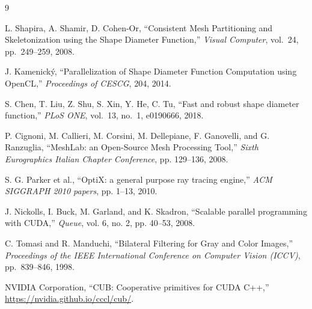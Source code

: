 \documentclass[12pt,a4paper]{report}
\begin{document}










\newpage
{}
\begin{thebibliography}{9}

L. Shapira, A. Shamir, D. Cohen-Or,
\newblock ``Consistent Mesh Partitioning and Skeletonization using the Shape Diameter Function,''
\newblock \emph{Visual Computer}, vol.~24, pp.~249--259, 2008.

J. Kamenick\'{y},
\newblock ``Parallelization of Shape Diameter Function Computation using OpenCL,''
\newblock \emph{Proceedings of CESCG}, 204, 2014.

S. Chen, T. Liu, Z. Shu, S. Xin, Y. He, C. Tu,
\newblock ``Fast and robust shape diameter function,''
\newblock \emph{PLoS ONE}, vol.~13, no.~1, e0190666, 2018.

P. Cignoni, M. Callieri, M. Corsini, M. Dellepiane, F. Ganovelli, and G. Ranzuglia,
\newblock ``MeshLab: an Open-Source Mesh Processing Tool,''
\newblock \emph{Sixth Eurographics Italian Chapter Conference}, pp. 129--136, 2008.

S. G. Parker et al.,
\newblock ``OptiX: a general purpose ray tracing engine,''
\newblock \emph{ACM SIGGRAPH 2010 papers}, pp. 1--13, 2010.

J. Nickolls, I. Buck, M. Garland, and K. Skadron,
\newblock ``Scalable parallel programming with CUDA,''
\newblock \emph{Queue}, vol. 6, no. 2, pp. 40--53, 2008.

C. Tomasi and R. Manduchi,
\newblock ``Bilateral Filtering for Gray and Color Images,''
\newblock \emph{Proceedings of the IEEE International Conference on Computer Vision (ICCV)}, pp.~839--846, 1998.

NVIDIA Corporation,
\newblock ``CUB: Cooperative primitives for CUDA C++,''
\newblock \url{https://nvidia.github.io/cccl/cub/}.


\end{thebibliography}
\end{document}
